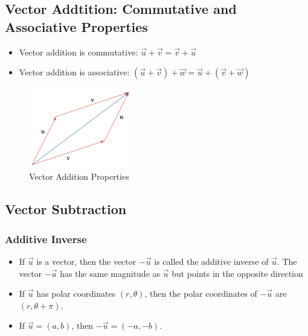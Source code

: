\subsection{Vector Addtition: Commutative and Associative Properties}
\begin{itemize}
    \item Vector addition is commutative: \(\vec u + \vec v = \vec v + \vec u\)
    \item Vector addition is associative: \((\vec u + \vec v) + \vec w = \vec u + (\vec v + \vec w)\)
\end{itemize}
\begin{figure}
    \centering
    \includegraphics[width=0.4\textwidth]{pics/vector4.png}
    \caption{Vector Addition Properties}
    \label{fig:vector_subtraction}
\end{figure}

\subsection{Vector Subtraction}
\subsubsection{Additive Inverse}
\begin{itemize}
    \item If \(\vec u \) is a vector, then the vector \(-\vec u\) is called the additive inverse of \(\vec u\). The vector \(-\vec u\) has the same magnitude as \(\vec u\) but points in the opposite direction
    \item If \(\vec u\) has polar coordinates \((r, \theta)\), then the polar coordinates of \(-\vec u\) are \((r, \theta + \pi)\).
    \item If \(\vec u = (a,b)\), then \(-\vec u = (-a,-b)\).
\end{itemize}

